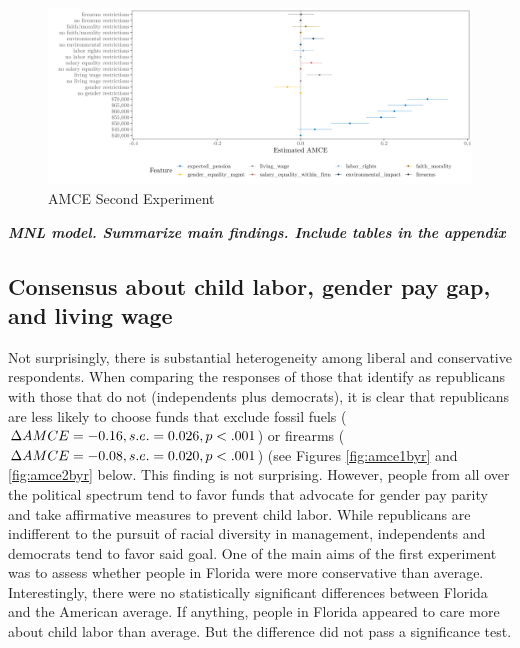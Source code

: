 \documentclass[
  12pt,
]{article}
\begin{document}
\begin{landscape}

\begin{figure}

{\centering \includegraphics{amcecj2jmain} 

}

\caption{AMCE Second Experiment}\label{fig:amce2cjmain}
\end{figure}

\end{landscape}

\textbf{\emph{MNL model. Summarize main findings. Include tables in the appendix}}

\hypertarget{consensus-about-child-labor-gender-pay-gap-and-living-wage}{%
\subsection{Consensus about child labor, gender pay gap, and living wage}\label{consensus-about-child-labor-gender-pay-gap-and-living-wage}}

Not surprisingly, there is substantial heterogeneity among liberal and conservative respondents. When comparing the responses of those that identify as republicans with those that do not (independents plus democrats), it is clear that republicans are less likely to choose funds that exclude fossil fuels (\(\Delta AMCE = -0.16, \space s.e. = 0.026, \space p <.001\)) or firearms (\(\Delta AMCE = -0.08, \space s.e. = 0.020, \space p<.001\)) (see Figures \ref{fig:amce1byr} and \ref{fig:amce2byr} below. This finding is not surprising. However, people from all over the political spectrum tend to favor funds that advocate for gender pay parity and take affirmative measures to prevent child labor. While republicans are indifferent to the pursuit of racial diversity in management, independents and democrats tend to favor said goal. One of the main aims of the first experiment was to assess whether people in Florida were more conservative than average. Interestingly, there were no statistically significant differences between Florida and the American average. If anything, people in Florida appeared to care more about child labor than average. But the difference did not pass a significance test.
\end{document}
